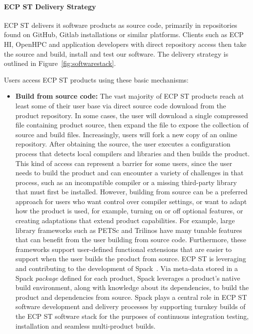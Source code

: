 \paragraph{ECP ST Delivery Strategy}
ECP ST delivers it software products as source code, primarily in repositories found on GitHub, Gitlab installations or similar platforms. Clients such as ECP HI, OpenHPC and application developers with direct repository access then take the source and build, install and test our software. The delivery strategy is outlined in Figure~\ref{fig:softwarestack}.  

Users access ECP ST products using these basic mechanisms:
\begin{itemize}
	\item \textbf{Build from source code:} The vast majority of ECP ST products reach at least some of their user base via direct source code download from the product repository.  In some cases, the user will download a single compressed file containing product source, then expand the file to expose the collection of source and build files.  Increasingly, users will fork a new copy of an online repository.  After obtaining the source, the user executes a configuration process that detects local compilers and libraries and then builds the product.  This kind of access can represent a barrier for some users, since the user needs to build the product and can encounter a variety of challenges in that process, such as an incompatible compiler or a missing third-party library that must first be installed.  However, building from source can be a preferred approach for users who want control over compiler settings, or want to adapt how the product is used, for example, turning on or off optional features, or creating adaptations that extend product capabilities.  For example, large library frameworks such as PETSc and Trilinos have many tunable features that can benefit from the user building from source code.  Furthermore, these frameworks support user-defined functional extensions that are easier to support when the user builds the product from source.  ECP ST is leveraging and contributing to the development of Spack~\cite{gamblin+:sc15}.  Via meta-data stored in a Spack \textit{package} defined for each product, Spack leverages a product's native build environment, along with knowledge about its dependencies, to build the product and dependencies from source.  Spack plays a central role in ECP ST software development and delivery processes by supporting turnkey builds of the ECP ST software stack for the purposes of continuous integration testing, installation and seamless multi-product builds.

\end{itemize}
